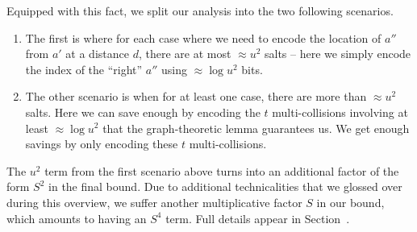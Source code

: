 Equipped with this fact, we split our analysis into the two following scenarios.
\begin{enumerate}
\item  The first is where for each case where we need to encode the location of $a''$ from $a'$ at a distance $d$, there are at most $\approx u^2$ salts -- here we simply encode the index of the ``right'' $a''$ using $\approx \log u^2$ bits. 
\item The other scenario is when for at least one case, there are more than $\approx u^2$ salts. Here we can save enough by encoding the $t$ multi-collisions involving at least $\approx \log u^2$ that the graph-theoretic lemma guarantees us. We get enough savings by only encoding these $t$ multi-collisions.
\end{enumerate}

The $u^2$ term from the first scenario above turns into an additional factor of the form $S^2$ in the final bound. Due to additional technicalities that we glossed over during this overview, we suffer another multiplicative factor $S$ in our bound, which amounts to having an $S^4$ term. Full details appear in Section~.


